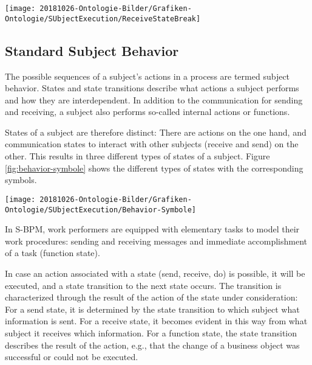 \begin{figure*}[htbp]
	\centering
	\texttt{[image: 20181026-Ontologie-Bilder/Grafiken-Ontologie/SUbjectExecution/ReceiveStateBreak]}
	\caption[Message reception with manual interrupt]{Message reception with manual interrupt}
	\label{fig:receivestatebreak}
\end{figure*}

\subsection{Standard Subject Behavior}

The possible sequences of a subject's actions in a process are termed subject behavior. States and state transitions describe what actions a subject performs and how they are interdependent. In addition to the communication for sending and receiving, a subject also performs so-called internal actions or functions.

States of a subject are therefore distinct: There are actions on the one hand, and communication states to interact with other subjects (receive and send) on the other. This results in three different types of states of a subject. Figure \ref{fig:behavior-symbole} shows the different types of states with the corresponding symbols.

\begin{figure*}[htbp]
	\centering
	\texttt{[image: 20181026-Ontologie-Bilder/Grafiken-Ontologie/SUbjectExecution/Behavior-Symbole]}
	\caption[State types and coresponding symbols]{State types and coresponding symbols}
	\label{fig:behavior-symbole}
\end{figure*}

In S-BPM, work performers are equipped with elementary tasks to model their work procedures: sending and receiving messages and immediate accomplishment of a task (function state).

In case an action associated with a state (send, receive, do) is possible, it will be executed, and a state transition to the next state occurs. The transition is characterized through the result of the action of the state under consideration: For a send state, it is determined by the state transition to which subject what information is sent. For a receive state, it becomes evident in this way from what subject it receives which information. For a function state, the state transition describes the result of the action, e.g., that the change of a business object was successful or could not be executed.

